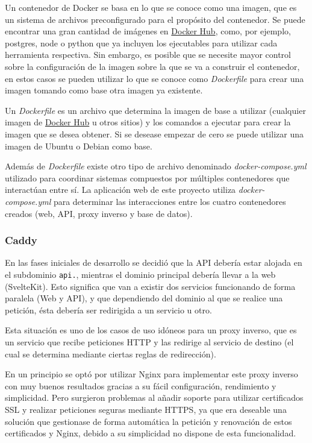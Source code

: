 Un contenedor de Docker se basa en lo que se conoce como una imagen, que es un
sistema de archivos preconfigurado para el propósito del contenedor. Se puede
encontrar una gran cantidad de imágenes en \href{https://hub.docker.com/}{Docker
Hub}, como, por ejemplo, postgres, node o python que ya incluyen los ejecutables
para utilizar cada herramienta respectiva. Sin embargo, es posible que se
necesite mayor control sobre la configuración de la imagen sobre la que se va a
construir el contenedor, en estos casos se pueden utilizar lo que se conoce como
\textit{Dockerfile} para crear una imagen tomando como base otra imagen ya
existente.

Un \textit{Dockerfile} es un archivo que determina la imagen de base a utilizar
(cualquier imagen de \href{https://hub.docker.com/}{Docker Hub} u otros sitios)
y los comandos a ejecutar para crear la imagen que se desea obtener. Si se
desease empezar de cero se puede utilizar una imagen de Ubuntu o Debian como
base.

Además de \textit{Dockerfile} existe otro tipo de archivo denominado
\textit{docker-compose.yml} utilizado para coordinar sistemas compuestos por
múltiples contenedores que interactúan entre sí. La aplicación web de este
proyecto utiliza \textit{docker-compose.yml} para determinar las interacciones
entre los cuatro contenedores creados (web, API, proxy inverso y base de
datos).

\subsubsection{Caddy}

En las fases iniciales de desarrollo se decidió que la API debería estar alojada
en el subdominio \texttt{api.}, mientras el dominio principal debería llevar a
la web (SvelteKit). Esto significa que van a existir dos servicios funcionando
de forma paralela (Web y API), y que dependiendo del dominio al que se realice
una petición, ésta debería ser redirigida a un servicio u otro.

Esta situación es uno de los casos de uso idóneos para un proxy inverso, que es
un servicio que recibe peticiones HTTP y las redirige al servicio de destino (el
cual se determina mediante ciertas reglas de redirección).

En un principio se optó por utilizar Nginx para implementar este proxy inverso
con muy buenos resultados gracias a su fácil configuración, rendimiento y
simplicidad. Pero surgieron problemas al añadir soporte para utilizar
certificados SSL y realizar peticiones seguras mediante HTTPS, ya que era
deseable una solución que gestionase de forma automática la petición y
renovación de estos certificados y Nginx, debido a su simplicidad no dispone de
esta funcionalidad.

